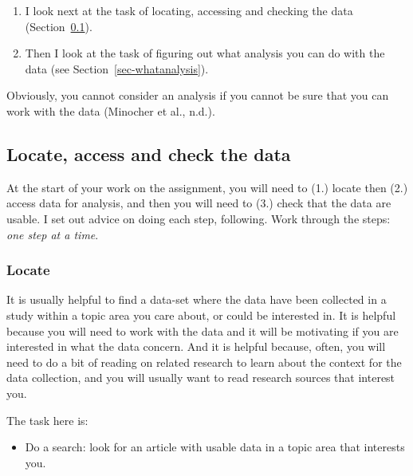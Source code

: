 \documentclass[
  letterpaper,
  DIV=11,
  numbers=noendperiod]{scrreprt}
\providecommand{\tightlist}{%
  \setlength{\itemsep}{0pt}\setlength{\parskip}{0pt}}\usepackage{longtable,booktabs,array}
\begin{document}
\begin{enumerate}
\def\labelenumi{\arabic{enumi}.}
\tightlist
\item
  I look next at the task of locating, accessing and checking the data
  (Section~\ref{sec-locateaccesscheck}).
\item
  Then I look at the task of figuring out what analysis you can do with
  the data (see Section~\ref{sec-whatanalysis}).
\end{enumerate}

Obviously, you cannot consider an analysis if you cannot be sure that
you can work with the data (Minocher et al., n.d.).

\hypertarget{sec-locateaccesscheck}{%
\subsection{Locate, access and check the
data}\label{sec-locateaccesscheck}}

At the start of your work on the assignment, you will need to (1.)
locate then (2.) access data for analysis, and then you will need to
(3.) check that the data are usable. I set out advice on doing each
step, following. Work through the steps: \emph{one step at a time}.

\hypertarget{sec-locate}{%
\subsubsection{Locate}\label{sec-locate}}

It is usually helpful to find a data-set where the data have been
collected in a study within a topic area you care about, or could be
interested in. It is helpful because you will need to work with the data
and it will be motivating if you are interested in what the data
concern. And it is helpful because, often, you will need to do a bit of
reading on related research to learn about the context for the data
collection, and you will usually want to read research sources that
interest you.

\begin{tcolorbox}[enhanced jigsaw, opacitybacktitle=0.6, title=\textcolor{quarto-callout-tip-color}{\faLightbulb}\hspace{0.5em}{Tip}, arc=.35mm, colbacktitle=quarto-callout-tip-color!10!white, colframe=quarto-callout-tip-color-frame, leftrule=.75mm, opacityback=0, breakable, titlerule=0mm, left=2mm, bottomrule=.15mm, toprule=.15mm, colback=white, coltitle=black, bottomtitle=1mm, toptitle=1mm, rightrule=.15mm]

The task here is:

\begin{itemize}
\tightlist
\item
  Do a search: look for an article with usable data in a topic area that
  interests you.
\end{itemize}

\end{tcolorbox}
\end{document}
